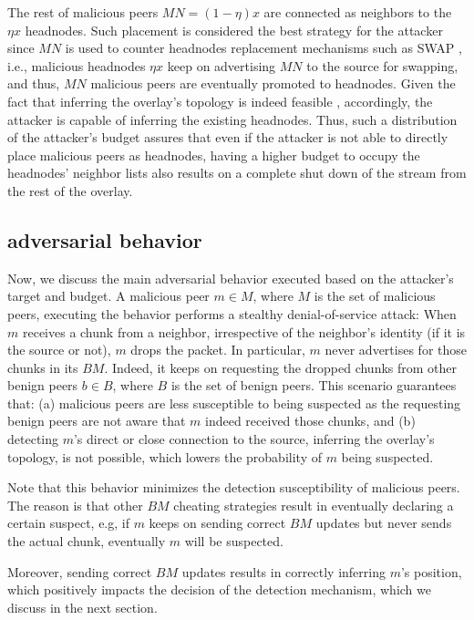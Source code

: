The rest of malicious peers $MN=(1-\eta) x$ are connected as neighbors to the $\eta x$ headnodes. 
Such placement is considered the best strategy for the attacker since $MN$ is used to counter headnodes replacement mechanisms such as SWAP \cite{nguyen2016swap}, i.e., malicious headnodes $\eta x$ keep on advertising $MN$ to the source for swapping, and thus, $MN$ malicious peers are eventually promoted to headnodes. 
Given the fact that inferring the overlay's topology is indeed feasible \cite{nguyen2016swap,rbcs}, accordingly, the attacker is capable of inferring the existing headnodes.
Thus, such a distribution of the attacker's budget assures that even if the attacker is not able to directly place malicious peers as headnodes, having a higher budget to occupy the headnodes' neighbor lists also results on a complete shut down of the stream from the rest of the overlay.



\subsection{\drop adversarial behavior}
Now, we discuss the main adversarial behavior executed based on the attacker's target and budget. 
A malicious peer $m \in M$, where $M$ is the set of malicious peers, executing the \drop behavior performs a stealthy denial-of-service attack: 
When $m$ receives a chunk from a neighbor, irrespective of the neighbor's identity (if it is the source or not), $m$ drops the packet.
In particular, $m$ never advertises for those chunks in its $BM$.
Indeed, it keeps on requesting the dropped chunks from other benign peers $b \in B$, where $B$ is the set of benign peers.
This scenario guarantees that: (a) malicious peers are less susceptible to being suspected as the requesting benign peers are not aware that $m$ indeed received those chunks,
and (b) detecting $m$'s direct or close connection to the source, inferring the overlay's topology, is not possible, which lowers the probability of $m$ being suspected.



Note that this behavior minimizes the detection susceptibility of malicious peers.
The reason is that other $BM$ cheating strategies result in eventually declaring a certain suspect, e.g, if $m$ keeps on sending correct $BM$ updates but never sends the actual chunk, eventually $m$ will be suspected.

Moreover, sending correct $BM$ updates results in correctly inferring $m$'s position, which positively impacts the decision of the detection mechanism, which we discuss in the next section. 





